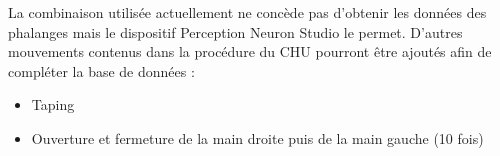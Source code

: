 \documentclass{article}
\begin{document}
La combinaison utilisée actuellement ne concède pas  d'obtenir les données des phalanges mais le dispositif Perception Neuron Studio le permet. D'autres mouvements contenus dans la procédure du CHU pourront être ajoutés afin de compléter la base de données :

\begin{itemize}
	\item Taping 
	\item Ouverture et fermeture de la main droite puis de la main gauche (10 fois) 
\end{itemize}

\newpage
\printglossary
\printglossary[type=\acronymtype]
\end{document}
